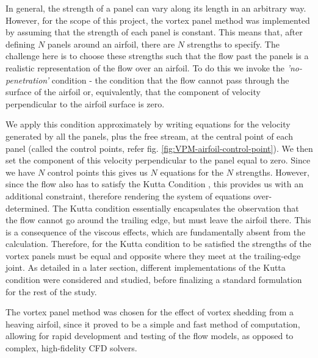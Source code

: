 In general, the strength of a panel can vary along its length in an arbitrary way. However, for the scope of this project, the vortex panel method was implemented by assuming that the strength of each panel is constant. This means that, after defining $N$ panels around an airfoil, there are $N$ strengths to specify. The challenge here is to choose these strengths such that the flow past the panels is a realistic representation of the flow over an airfoil. To do this we invoke the \textit{'no-penetration’} condition - the condition that the flow cannot pass through the surface of the airfoil or, equivalently, that the component of velocity perpendicular to the airfoil surface is zero. 

We apply this condition approximately by writing equations for the velocity generated by all the panels, plus the free stream, at the central point of each panel (called the control points, refer fig. \ref{fig:VPM-airfoil-control-point}). We then set the component of this velocity perpendicular to the panel equal to zero.  Since we have $N$ control points this gives us $N$ equations for the $N$ strengths. However, since the flow also has to satisfy the Kutta Condition \parencite{Clancy1986-sd, Kuethe1987-qq}, this provides us with an additional constraint, therefore rendering the system of equations over-determined. The Kutta condition essentially encapsulates the observation that the flow cannot go around the trailing edge, but must leave the airfoil there. This is a consequence of the viscous effects, which are fundamentally absent from the calculation. Therefore, for the Kutta condition to be satisfied the strengths of the vortex panels must be equal and opposite where they meet at the trailing-edge joint. As detailed in a later section, different implementations of the Kutta condition were considered and studied, before finalizing a standard formulation for the rest of the study.

The vortex panel method was chosen for the effect of vortex shedding from a heaving airfoil, since it proved to be a simple and fast method of computation, allowing for rapid development and testing of the flow models, as opposed to complex, high-fidelity CFD solvers.


